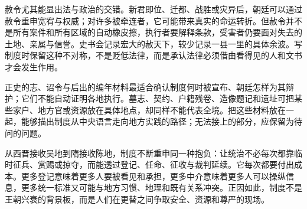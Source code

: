 赦令尤其能显出法与政治的交错。新君即位、迁都、战胜或灾异后，朝廷可以通过赦令重申宽宥与权威；对许多被牵连者，它可能带来真实的命运转折。但赦令并不是所有案件和所有区域的自动橡皮擦，执行者要解释条款，受害者仍要面对失去的土地、亲属与信誉。史书会记录宏大的赦天下，较少记录一县一里的具体余波。写制度时保留这种不对称，不是贬低法律，而是承认法律必须借由看得见的人和文书才会发生作用。

\begin{sourcenote}[制度材料能说到哪里]
正史的志、诏令与后出的编年材料最适合确认制度何时被宣布、朝廷怎样为其辩护；它们不能自动证明各地执行。墓志、契约、户籍残卷、造像题记和遗址可把某些家户、地方官或资源放在具体地点，却同样不能代表全境。把这些材料放在一起，能够描出制度从中央语言走向地方实践的路径；无法接上的部分，应保留为待问的问题。
\end{sourcenote}

从西晋接收吴地到隋接收陈地，制度不断重申同一种抱负：让统治不必每次都靠临时征兵、赏赐或掠夺，而能透过登记、任命、征收与裁判延续。它每次都要付出成本。更多登记意味着更多人要被看见和承担，更多中介意味着更多人可以操纵信息，更多统一标准又可能与地方习惯、地理和既有关系冲突。正因如此，制度不是王朝兴衰的背景板，而是人们在更替之间争取安全、资源和尊严的现场。

